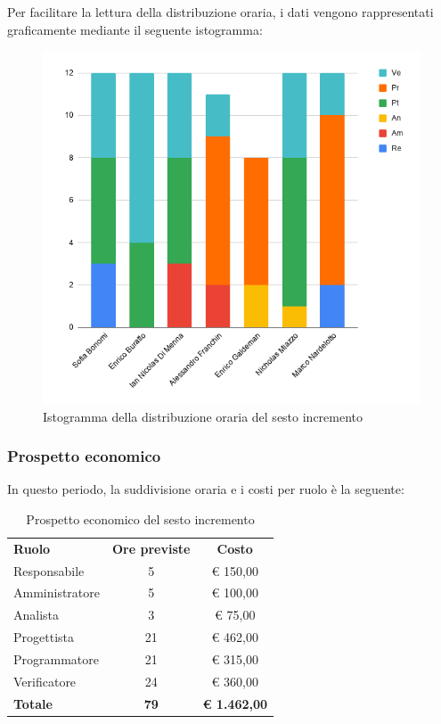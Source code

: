 \documentclass[../piano-di-progetto.tex]{subfiles}
\begin{document}
  Per facilitare la lettura della distribuzione oraria, i dati vengono rappresentati graficamente mediante il seguente istogramma:
  \begin{figure}[H]
    \centering
    \includegraphics[width=12cm]{img/ore-6-incr.png}
    \caption{Istogramma della distribuzione oraria del sesto incremento}
    \label{fig:ore-componente-progettazione}
  \end{figure}

  \subsubsection{Prospetto economico}
  In questo periodo, la suddivisione oraria e i costi per ruolo è la seguente:

  \begin{table}[H]
    \centering
    \begin{tabular}{lcc}
      \rowcolor{lightgray}
      \textbf{Ruolo}  & \textbf{Ore previste} & \textbf{Costo}      \\
Responsabile    & 5                     & € 150,00            \\
Amministratore  & 5                     & € 100,00            \\
Analista        & 3                     & € 75,00             \\
Progettista     & 21                    & € 462,00            \\
Programmatore   & 21                    & € 315,00            \\
Verificatore    & 24                    & € 360,00            \\
\textbf{Totale} & \textbf{79}           & \textbf{€ 1.462,00}
    \end{tabular}
    \caption{Prospetto economico del sesto incremento}
  \end{table}
\end{document}
